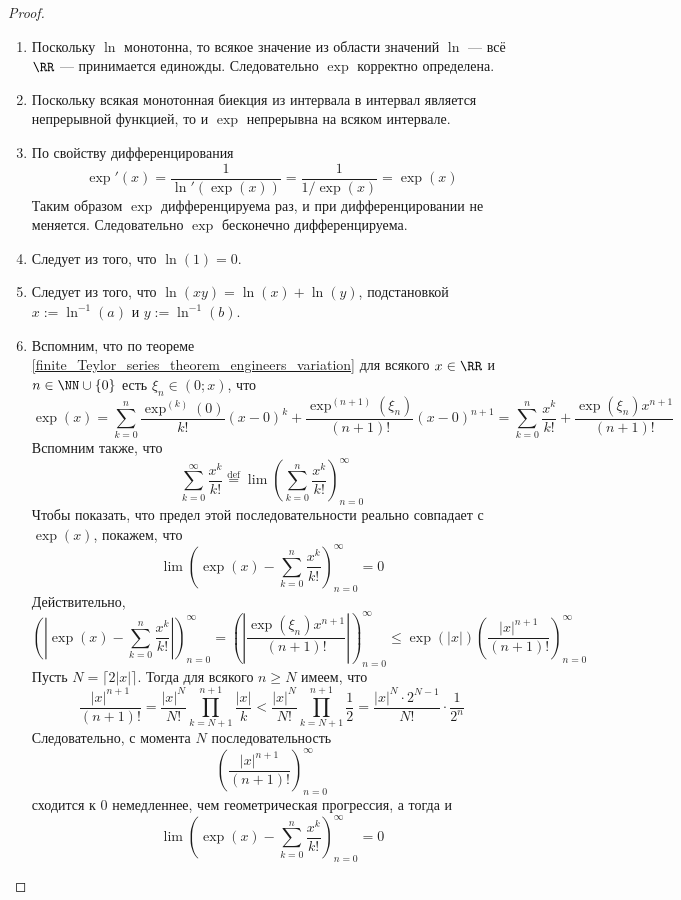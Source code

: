 \documentclass[12pt,a4paper]{article}
\newcommand{\eqdef}{\mathbin{\stackrel{\mathrm{def}}{=}}}
\begin{document}
    \begin{proof}\ 
        \begin{enumerate}
            \item Поскольку $\ln$ монотонна, то всякое значение из области значений $\ln$ --- всё $\RR$ --- принимается единожды. Следовательно $\exp$ корректно определена.
            \item Поскольку всякая монотонная биекция из интервала в интервал является непрерывной функцией, то и $\exp$ непрерывна на всяком интервале.
            \item По свойству дифференцирования
                \[\exp'(x) = \frac{1}{\ln'(\exp(x))} = \frac{1}{1/\exp(x)} = \exp(x)\]
                Таким образом $\exp$ дифференцируема раз, и при дифференцировании не меняется. Следовательно $\exp$ бесконечно дифференцируема.
            \item Следует из того, что $\ln(1) = 0$.
            \item Следует из того, что $\ln(xy) = \ln(x) + \ln(y)$, подстановкой $x := \ln^{-1}(a)$ и $y := \ln^{-1}(b)$.
            \item Вспомним, что по теореме \ref{finite_Teylor_series_theorem_engineers_variation} для всякого $x \in \RR$ и $n \in \NN \cup \{0\}$ есть $\xi_n \in (0; x)$, что
                \[
                    \exp(x)
                    = \sum_{k=0}^n \frac{\exp^{(k)}(0)}{k!}(x-0)^k + \frac{\exp^{(n+1)}(\xi_n)}{(n+1)!}(x-0)^{n+1}
                    = \sum_{k=0}^n \frac{x^k}{k!} + \frac{\exp(\xi_n)x^{n+1}}{(n+1)!}
                \]
                Вспомним также, что
                \[
                    \sum_{k=0}^\infty \frac{x^k}{k!} \eqdef \lim \left(\sum_{k=0}^n \frac{x^k}{k!}\right)_{n=0}^\infty
                \]
                Чтобы показать, что предел этой последовательности реально совпадает с $\exp(x)$, покажем, что
                \[\lim \left(\exp(x) - \sum_{k=0}^n \frac{x^k}{k!}\right)_{n=0}^\infty = 0\]
                Действительно,
                \[
                    \left(\left|\exp(x) - \sum_{k=0}^n \frac{x^k}{k!}\right|\right)_{n=0}^\infty
                    = \left(\left|\frac{\exp(\xi_n)x^{n+1}}{(n+1)!}\right|\right)_{n=0}^\infty
                    \leqslant \exp(|x|) \left(\frac{|x|^{n+1}}{(n+1)!}\right)_{n=0}^\infty
                \]
                Пусть $N = \lceil 2|x| \rceil$. Тогда для всякого $n \geqslant N$ имеем, что
                \[
                    \frac{|x|^{n+1}}{(n+1)!}
                    = \frac{|x|^N}{N!} \prod_{k=N+1}^{n+1} \frac{|x|}{k}
                    < \frac{|x|^N}{N!} \prod_{k=N+1}^{n+1} \frac{1}{2}
                    = \frac{|x|^N\cdot 2^{N-1}}{N!} \cdot \frac{1}{2^n}
                \]
                Следовательно, с момента $N$ последовательность
                \[\left(\frac{|x|^{n+1}}{(n+1)!}\right)_{n=0}^\infty\]
                сходится к $0$ немедленнее, чем геометрическая прогрессия, а тогда и
                \[\lim \left(\exp(x) - \sum_{k=0}^n \frac{x^k}{k!}\right)_{n=0}^\infty = 0\]
        \end{enumerate}
    \end{proof}
\end{document}
